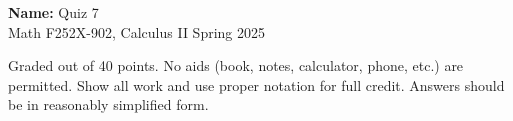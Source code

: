 \documentclass[12pt]{article}
\begin{document}
\pagestyle{plain}

\noindent \textbf{Name:} \underline{\hspace{15em}}		\hfill	Quiz 7 \\
           Math F252X-902, Calculus II  			\hfill	Spring 2025 	

                \vspace{1cm}
                
Graded out of 40 points. No aids (book, notes,
calculator, phone, etc.) are permitted. Show all work and use proper
notation for full credit. Answers should be in reasonably simplified
form.
\end{document}
